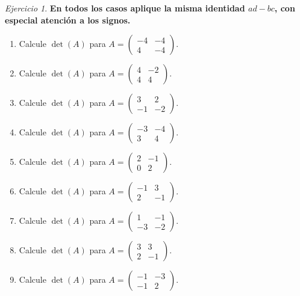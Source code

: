 \documentclass[12pt]{article}
\theoremstyle{remark}
\newtheorem{Ejer}[definicion]{Ejercicio}
\begin{document}
\begin{Ejer}

\textbf{En todos los casos aplique la misma identidad $ad-bc$, con especial atención a los signos.}
\begin{enumerate}[start=139]

\item Calcule $\det(A)$ para $A=\begin{pmatrix}-4&-4\\4&-4\end{pmatrix}$.

\item Calcule $\det(A)$ para $A=\begin{pmatrix}4&-2\\4&4\end{pmatrix}$.

\item Calcule $\det(A)$ para $A=\begin{pmatrix}3&2\\-1&-2\end{pmatrix}$.

\item Calcule $\det(A)$ para $A=\begin{pmatrix}-3&-4\\3&4\end{pmatrix}$.

\item Calcule $\det(A)$ para $A=\begin{pmatrix}2&-1\\0&2\end{pmatrix}$.

\item Calcule $\det(A)$ para $A=\begin{pmatrix}-1&3\\2&-1\end{pmatrix}$.

\item Calcule $\det(A)$ para $A=\begin{pmatrix}1&-1\\-3&-2\end{pmatrix}$.

\item Calcule $\det(A)$ para $A=\begin{pmatrix}3&3\\2&-1\end{pmatrix}$.

\item Calcule $\det(A)$ para $A=\begin{pmatrix}-1&-3\\-1&2\end{pmatrix}$.


\end{enumerate}
\end{Ejer}
\end{document}
